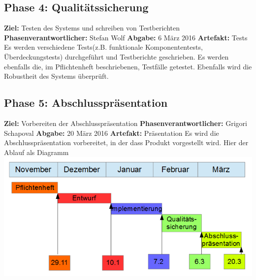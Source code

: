 \subsection{Phase 4: Qualitätssicherung}
\textbf{Ziel:} Testen des Systems und schreiben von Testberichten \newline
\textbf{Phasenverantwortlicher:} Stefan Wolf  \newline
\textbf{Abgabe:} 6 März 2016 \newline
\textbf{Artefakt:} Tests \newline
Es werden verschiedene Tests(z.B. funktionale Komponententests, Überdeckungstests) durchgeführt und Testberichte geschrieben. Es werden ebenfalls die, im Pflichtenheft beschriebenen, Testfälle getestet. Ebenfalls wird die Robustheit des Systems überprüft.

\subsection{Phase 5: Abschlusspräsentation}
\textbf{Ziel:} Vorbereiten der Abschlusspräsentation \newline
\textbf{Phasenverantwortlicher:} Grigori Schapoval  \newline
\textbf{Abgabe:} 20 März 2016 \newline
\textbf{Artefakt:} Präsentation \newline
Es wird die Abschlusspräsentation vorbereitet, in der dass Produkt vorgestellt wird. \newline
\newline
\newline
Hier der Ablauf als Diagramm \newline
\includegraphics{img/ablauf.png}
